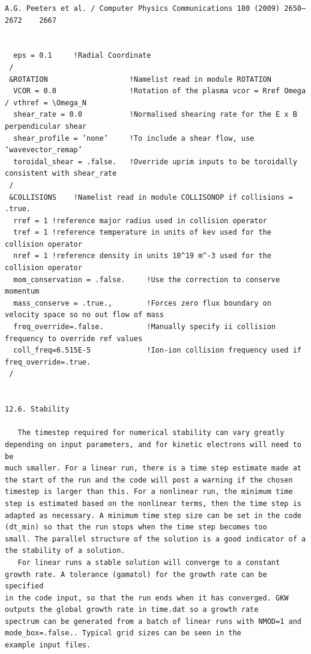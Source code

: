 \documentclass[a4paper]{article}
\newcommand{\gkwpagefont}{\fontsize{6.0pt}{7.55pt}\selectfont}
\begin{document}
\newpage
\begin{Verbatim}[fontsize=\gkwpagefont]
                                                                A.G. Peeters et al. / Computer Physics Communications 180 (2009) 2650–2672    2667


  eps = 0.1     !Radial Coordinate
 /
 &ROTATION                   !Namelist read in module ROTATION
  VCOR = 0.0                 !Rotation of the plasma vcor = Rref Omega / vthref = \Omega_N
  shear_rate = 0.0           !Normalised shearing rate for the E x B perpendicular shear
  shear_profile = ’none’     !To include a shear flow, use ‘wavevector_remap’
  toroidal_shear = .false.   !Override uprim inputs to be toroidally consistent with shear_rate
 /
 &COLLISIONS    !Namelist read in module COLLISONOP if collisions = .true.
  rref = 1 !reference major radius used in collision operator
  tref = 1 !reference temperature in units of kev used for the collision operator
  nref = 1 !reference density in units 10^19 m^-3 used for the collision operator
  mom_conservation = .false.     !Use the correction to conserve momentum
  mass_conserve = .true.,        !Forces zero flux boundary on velocity space so no out flow of mass
  freq_override=.false.          !Manually specify ii collision frequency to override ref values
  coll_freq=6.515E-5             !Ion-ion collision frequency used if freq_override=.true.
 /


12.6. Stability

   The timestep required for numerical stability can vary greatly depending on input parameters, and for kinetic electrons will need to be
much smaller. For a linear run, there is a time step estimate made at the start of the run and the code will post a warning if the chosen
timestep is larger than this. For a nonlinear run, the minimum time step is estimated based on the nonlinear terms, then the time step is
adapted as necessary. A minimum time step size can be set in the code (dt_min) so that the run stops when the time step becomes too
small. The parallel structure of the solution is a good indicator of a the stability of a solution.
   For linear runs a stable solution will converge to a constant growth rate. A tolerance (gamatol) for the growth rate can be specified
in the code input, so that the run ends when it has converged. GKW outputs the global growth rate in time.dat so a growth rate
spectrum can be generated from a batch of linear runs with NMOD=1 and mode_box=.false.. Typical grid sizes can be seen in the
example input files.


\end{Verbatim}
\end{document}
